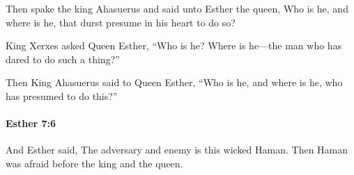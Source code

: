 			\begin{versebox}
					\item[BHS] 
					\item[LXX] 
					\item[ASV] Then spake the king Ahasuerus and said unto Esther the queen, Who is he, and where is he, that durst presume in his heart to do so?
					\item[NIV] King Xerxes asked Queen Esther, “Who is he? Where is he—the man who has dared to do such a thing?”
					\item[NRSV] Then King Ahasuerus said to Queen Esther, “Who is he, and where is he, who has presumed to do this?”
			\end{versebox}

		\paragraph{Esther 7:6} %
			\label{ESTHER-7-6}

			And Esther said, The adversary and enemy is this wicked Haman. Then Haman was afraid before the king and the queen.

